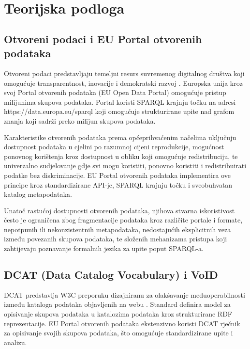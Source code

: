 \chapter{Teorijska podloga}
\label{ch:background}


\section{Otvoreni podaci i EU Portal otvorenih podataka}
\label{sec:open_data}

Otvoreni podaci predstavljaju temeljni resurs suvremenog digitalnog društva koji omogućuje transparentnost, inovacije i demokratski razvoj \cite{janssen2012benefits, charalabidis2018open, bizer2009linked}. Europska unija kroz svoj Portal otvorenih podataka (EU Open Data Portal) omogućuje pristup milijunima skupova podataka. Portal koristi SPARQL krajnju točku na adresi https://data.europa.eu/sparql koji omogućuje strukturirane upite nad grafom znanja koji sadrži preko milijun skupova podataka.

Karakteristike otvorenih podataka prema općeprihvaćenim načelima uključuju dostupnost podataka u cjelini po razumnoj cijeni reprodukcije, mogućnost ponovnog korištenja kroz dostupnost u obliku koji omogućuje redistribuciju, te univerzalno sudjelovanje gdje svi mogu koristiti, ponovno koristiti i redistribuirati podatke bez diskriminacije. EU Portal otvorenih podataka implementira ove principe kroz standardizirane API-je, SPARQL krajnju točku i sveobuhvatan katalog metapodataka.

Unatoč rastućoj dostupnosti otvorenih podataka, njihova stvarna iskoristivost često je ograničena zbog fragmentacije podataka kroz različite portale i formate, nepotpunih ili nekonzistentnih metapodataka, nedostajućih eksplicitnih veza između povezanih skupova podataka, te složenih mehanizama pristupa koji zahtijevaju poznavanje formalnih jezika za upite poput SPARQL-a.

\section{DCAT (Data Catalog Vocabulary) i VoID}
\label{sec:dcat}

DCAT predstavlja W3C preporuku dizajniranu za olakšavanje međuoperabilnosti između kataloga podataka objavljenih na webu \cite{dcat2020}. Standard definira model za opisivanje skupova podataka u katalozima podataka kroz strukturirane RDF reprezentacije. EU Portal otvorenih podataka ekstenzivno koristi DCAT rječnik za opisivanje svojih skupova podataka, što omogućuje standardizirane upite i analizu.

